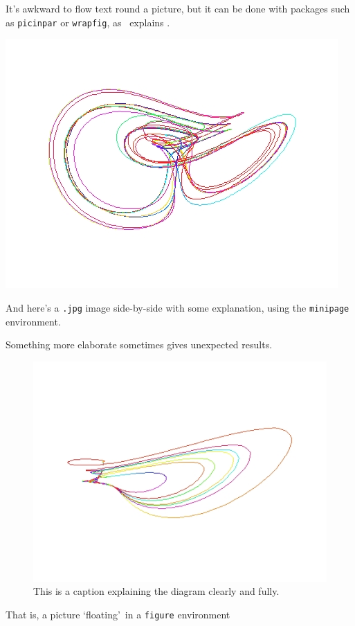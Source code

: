 It's awkward to flow text round a picture, but it can be done with
packages such as \texttt{picinpar} or \texttt{wrapfig}, as \comp\
explains \cite[Sec.~6.4.1]{MG}.
\begin{center}
\begin{minipage}[c]{.45\textwidth}\centering
\includegraphics[width=.9\textwidth]{pic2.jpg}
\end{minipage}
\hfill\begin{minipage}[c]{.45\textwidth} And here's a \texttt{.jpg}
image side-by-side with some explanation, using the \texttt{minipage}
environment.\end{minipage}\end{center}
Something more elaborate sometimes gives unexpected results.
\par
\begin{figure}[ht]\centering
  \includegraphics[width=.7\textwidth]{pic3.jpg}
  \caption{This is a caption explaining the diagram 
clearly and fully.}\label{fig:pic}
\end{figure}
That is, a picture \lq floating\rq\ in a \texttt{figure} environment
